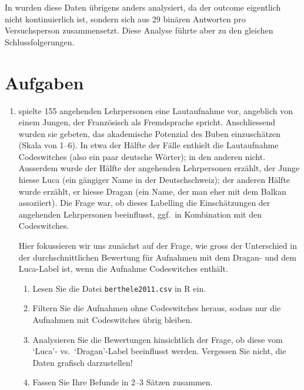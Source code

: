 \documentclass[oneside, 10pt]{book}\usepackage[]{graphicx}\usepackage[]{xcolor}
\begin{document}
In \citet{Vanhove2018} wurden diese Daten übrigens anders
analysiert, da der outcome eigentlich nicht
kontinuierlich ist, sondern sich aus 29 binären Antworten pro
Versuchsperson zusammensetzt. Diese Analyse führte aber zu
den gleichen Schlussfolgerungen.

\section{Aufgaben}

\begin{enumerate}

 \item \citet{Berthele2011b} spielte 155 angehenden Lehrpersonen eine Lautaufnahme vor,
 angeblich von einem Jungen, der Französisch als Fremdsprache spricht.
 An\-schliess\-end wurden sie gebeten, das akademische Potenzial des Buben einzuschätzen (Skala von 1--6).
 In etwa der Hälfte der Fälle enthielt die Lautaufnahme Codeswitches (also ein paar deutsche Wörter);
 in den anderen nicht. Ausserdem wurde der Hälfte der angehenden Lehrpersonen erzählt,
 der Junge hiesse Luca (ein gängiger Name in der Deutschschweiz);
 der anderen Hälfte wurde erzählt, er hiesse Dragan (ein Name, der man eher mit dem Balkan assoziiert).
 Die Frage war, ob dieses Labelling die Einschätzungen der angehenden Lehrpersonen beeinflusst,
 ggf.\ in Kombination mit den Codeswitches.

 Hier fokussieren wir uns zunächst auf der Frage, wie gross der Unterschied in der durchschnittlichen Bewertung
 für Aufnahmen mit dem Dragan- und dem Luca-Label ist, wenn die Aufnahme Codeswitches enthält.

 \begin{enumerate}
  \item Lesen Sie die Datei \texttt{berthele2011.csv} in R ein.
  \item Filtern Sie die Aufnahmen ohne Codeswitches heraus, sodass nur die Aufnahmen mit Codeswitches übrig bleiben.
  \item Analysieren Sie die Bewertungen hinsichtlich der Frage, ob diese vom `Luca'- vs.\ `Dragan'-Label beeinflusst werden.
        Vergessen Sie nicht, die Daten grafisch darzustellen!
  \item Fassen Sie Ihre Befunde in 2--3 Sätzen zusammen.
 \end{enumerate}


\end{enumerate}
\end{document}
